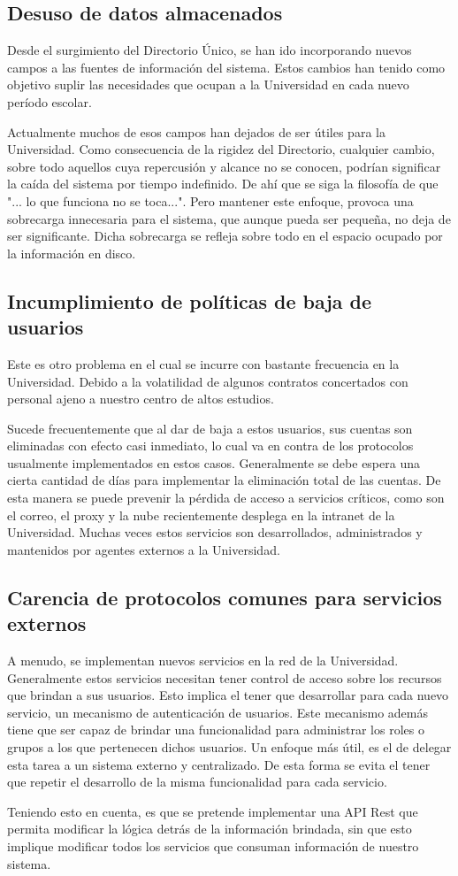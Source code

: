 \subsection{Desuso de datos almacenados}

Desde el surgimiento del Directorio Único, se han ido incorporando nuevos campos a las 
fuentes de información del sistema. Estos cambios han tenido como objetivo suplir las 
necesidades que ocupan a la Universidad en cada nuevo período escolar. 

Actualmente muchos de esos campos han dejados de ser útiles para la Universidad. Como
consecuencia de la rigidez del Directorio, cualquier cambio, sobre todo aquellos cuya 
repercusión y alcance no se conocen, podrían significar la caída del sistema por tiempo 
indefinido. De ahí que se siga la filosofía de que "... lo que funciona no se toca...". Pero
mantener este enfoque, provoca una sobrecarga innecesaria para el sistema, que aunque pueda
ser pequeña, no deja de ser significante. Dicha sobrecarga se refleja sobre todo en el 
espacio ocupado por la información en disco.

\subsection{Incumplimiento de políticas de baja de usuarios}

Este es otro problema en el cual se incurre con bastante frecuencia en la Universidad. 
Debido a la volatilidad de algunos contratos concertados con personal ajeno a nuestro 
centro de altos estudios. 

Sucede frecuentemente que al dar de baja a estos usuarios, sus cuentas son eliminadas con 
efecto casi inmediato, lo cual va en contra de los protocolos usualmente implementados en 
estos casos. Generalmente se debe espera una cierta cantidad de días para implementar la 
eliminación total de las cuentas. De esta manera se puede prevenir la pérdida de acceso a 
servicios críticos, como son el correo, el proxy y la nube recientemente desplega en la 
intranet de la Universidad. Muchas veces estos servicios son desarrollados, administrados 
y mantenidos por agentes externos a la Universidad. 


\subsection{Carencia de protocolos comunes para servicios externos}

A menudo, se implementan nuevos servicios en la red de la Universidad. Generalmente estos
servicios necesitan tener control de acceso sobre los recursos que brindan a sus usuarios.
Esto implica el tener que desarrollar para cada nuevo servicio, un mecanismo de 
autenticación de usuarios. Este mecanismo además tiene que ser capaz de brindar una 
funcionalidad para administrar los roles o grupos a los que pertenecen dichos usuarios.
Un enfoque más útil, es el de delegar esta tarea a un sistema externo y centralizado. De
esta forma se evita el tener que repetir el desarrollo de la misma funcionalidad para cada
servicio.

Teniendo esto en cuenta, es que se pretende implementar una API Rest que permita modificar 
la lógica detrás de la información brindada, sin que esto implique modificar todos los 
servicios que consuman información de nuestro sistema.







